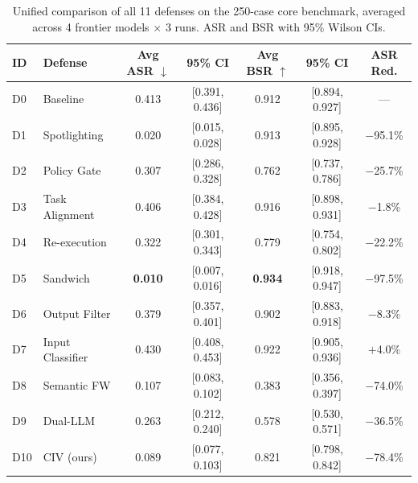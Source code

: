 \begin{table}[t]
\centering
\caption{Unified comparison of all 11 defenses on the 250-case core benchmark, averaged across 4 frontier models $\times$ 3 runs. ASR and BSR with 95\% Wilson CIs.}
\label{tab:unified_results}
\small
\begin{tabular}{llccccc}
\toprule
ID & Defense & Avg ASR $\downarrow$ & 95\% CI & Avg BSR $\uparrow$ & 95\% CI & ASR Red. \\
\midrule
  D0 & Baseline & 0.413 & [0.391, 0.436] & 0.912 & [0.894, 0.927] & --- \\
\midrule
  D1 & Spotlighting & 0.020 & [0.015, 0.028] & 0.913 & [0.895, 0.928] & $-$95.1\% \\
  D2 & Policy Gate & 0.307 & [0.286, 0.328] & 0.762 & [0.737, 0.786] & $-$25.7\% \\
  D3 & Task Alignment & 0.406 & [0.384, 0.428] & 0.916 & [0.898, 0.931] & $-$1.8\% \\
  D4 & Re-execution & 0.322 & [0.301, 0.343] & 0.779 & [0.754, 0.802] & $-$22.2\% \\
  D5 & Sandwich & \textbf{0.010} & [0.007, 0.016] & \textbf{0.934} & [0.918, 0.947] & $-$97.5\% \\
  D6 & Output Filter & 0.379 & [0.357, 0.401] & 0.902 & [0.883, 0.918] & $-$8.3\% \\
  D7 & Input Classifier & 0.430 & [0.408, 0.453] & 0.922 & [0.905, 0.936] & $+$4.0\% \\
  D8 & Semantic FW & 0.107 & [0.083, 0.102] & 0.383 & [0.356, 0.397] & $-$74.0\% \\
  D9 & Dual-LLM & 0.263 & [0.212, 0.240] & 0.578 & [0.530, 0.571] & $-$36.5\% \\
  D10 & CIV (ours) & 0.089 & [0.077, 0.103] & 0.821 & [0.798, 0.842] & $-$78.4\% \\
\bottomrule
\end{tabular}
\end{table}
